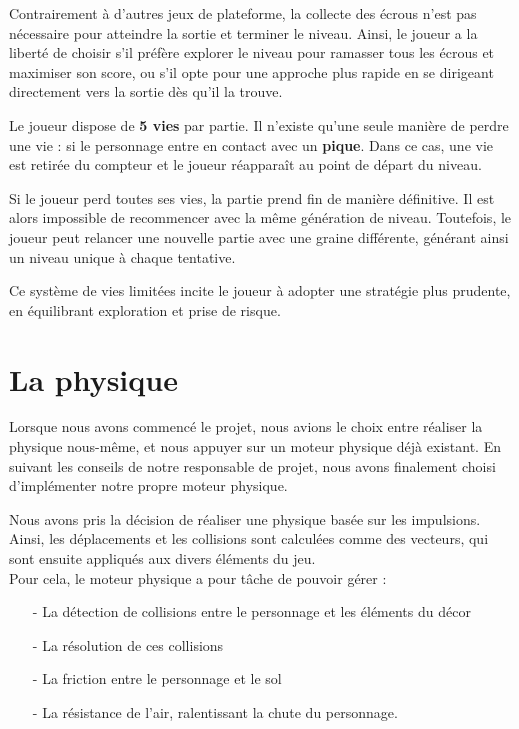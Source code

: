 \documentclass[10pt]{report}
\begin{document}
Contrairement à d'autres jeux de plateforme, la collecte des écrous n'est pas nécessaire pour atteindre la sortie et terminer le niveau. Ainsi, le joueur a la liberté de choisir s’il préfère explorer le niveau pour ramasser tous les écrous et maximiser son score, ou s’il opte pour une approche plus rapide en se dirigeant directement vers la sortie dès qu'il la trouve.

Le joueur dispose de \textbf{5 vies} par partie. Il n'existe qu'une seule manière de perdre une vie : si le personnage entre en contact avec un \textbf{pique}. Dans ce cas, une vie est retirée du compteur et le joueur réapparaît au point de départ du niveau.

Si le joueur perd toutes ses vies, la partie prend fin de manière définitive. Il est alors impossible de recommencer avec la même génération de niveau. Toutefois, le joueur peut relancer une nouvelle partie avec une graine différente, générant ainsi un niveau unique à chaque tentative.

Ce système de vies limitées incite le joueur à adopter une stratégie plus prudente, en équilibrant exploration et prise de risque. 

\section{La physique}
Lorsque nous avons commencé le projet, nous avions le choix entre réaliser la physique nous-même, et nous appuyer sur
un moteur physique déjà existant.
En suivant les conseils de notre responsable de projet, nous avons finalement choisi d'implémenter notre
propre moteur physique.

Nous avons pris la décision de réaliser une physique basée sur les impulsions.
Ainsi, les déplacements et les collisions sont calculées comme des vecteurs, qui sont ensuite appliqués aux
divers éléments du jeu.\\
Pour cela, le moteur physique a pour tâche de pouvoir gérer :
\begin{itemize}
  \item[-] La détection de collisions entre le personnage et les éléments du décor
  \item[-] La résolution de ces collisions
  \item[-] La friction entre le personnage et le sol
  \item[-] La résistance de l'air, ralentissant la chute du personnage.
\end{itemize}
\end{document}
